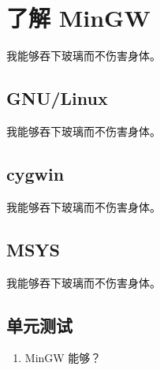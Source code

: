 %
%
%
%

\chapter{了解 MinGW}
\label{ch:intro}

我能够吞下玻璃而不伤害身体。

\section{GNU/Linux}
\label{sec:introGNU}
我能够吞下玻璃而不伤害身体。

\section{cygwin}
\label{sec:introCYG}
我能够吞下玻璃而不伤害身体。

\section{MSYS}
\label{sec:introMSYS}
我能够吞下玻璃而不伤害身体。

\section{单元测试}
\label{sec:introUT}
\begin{enumerate}
    \item MinGW 能够？
\end{enumerate}


\vfill
\begin{flushright}
\end{flushright}
\clearpage{\thispagestyle{empty}\cleardoublepage}

